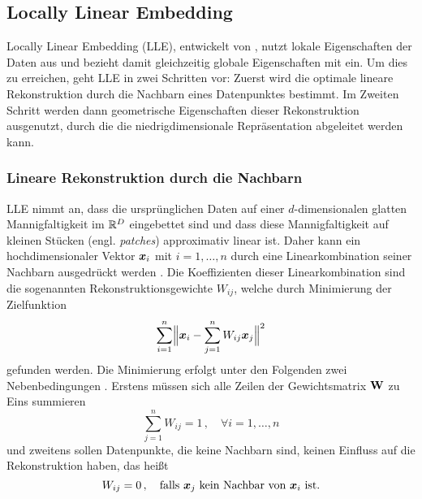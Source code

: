 \subsection{Locally Linear Embedding}
\label{ch:MethodenDerDimRed:statistisch:LLE}
Locally Linear Embedding (LLE), entwickelt von \textcite{Roweis.2000}, nutzt lokale Eigenschaften der Daten aus und bezieht damit gleichzeitig globale Eigenschaften mit ein. Um dies zu erreichen, geht LLE in zwei Schritten vor: Zuerst wird die optimale lineare Rekonstruktion durch die Nachbarn eines Datenpunktes bestimmt. Im Zweiten Schritt werden dann geometrische Eigenschaften dieser Rekonstruktion ausgenutzt, durch die die niedrigdimensionale Repräsentation abgeleitet werden kann.

\subsubsection{Lineare Rekonstruktion durch die Nachbarn}
\label{ch:MethodenDerDimRed:statistisch:LLE:LineareRekonstruktion}
LLE nimmt an, dass die ursprünglichen Daten auf einer $d$-dimensionalen glatten Mannigfaltigkeit im $\mathbb{R}^D$ eingebettet sind und dass diese Mannigfaltigkeit auf kleinen Stücken (engl. \textit{patches}) approximativ linear ist. Daher kann ein hochdimensionaler Vektor $\bm{x}_i$ mit $i = 1,\ldots,n$ durch eine Linearkombination seiner Nachbarn
ausgedrückt werden \parencite[2323]{Roweis.2000}. Die Koeffizienten dieser Linearkombination sind die sogenannten
Rekonstruktionsgewichte $W_{ij}$, welche durch Minimierung der Zielfunktion
\begin{equation}
	\label{eq:LLE:Zielfunktion}
	\sum_{i = 1}^n \norm[\Big]{ \vect{x}_i - \sum_{j = 1}^n W_{ij}\vect{x}_j}^2
\end{equation}
gefunden werden. Die Minimierung erfolgt unter den Folgenden zwei Nebenbedingungen \parencite[2]{Roweis.2000}. Erstens müssen sich alle Zeilen der Gewichtsmatrix $\mathbf{W}$ zu Eins
summieren
\begin{equation}
	\label{eq:LLE:ErsteNebenbedingung}
	\sum_{j = 1}^nW_{ij} = 1 \, , \quad \forall i = 1, \ldots, n
\end{equation}
und zweitens sollen Datenpunkte, die keine Nachbarn sind, keinen Einfluss auf die Rekonstruktion haben, das heißt
\begin{equation}
	\label{eq:LLE:ZweiteNebenbedingung}
	W_{ij} = 0 \, , \quad \text{falls } \vect{x}_j \text{ kein Nachbar von } \vect{x}_i \text{ ist.}
\end{equation}
